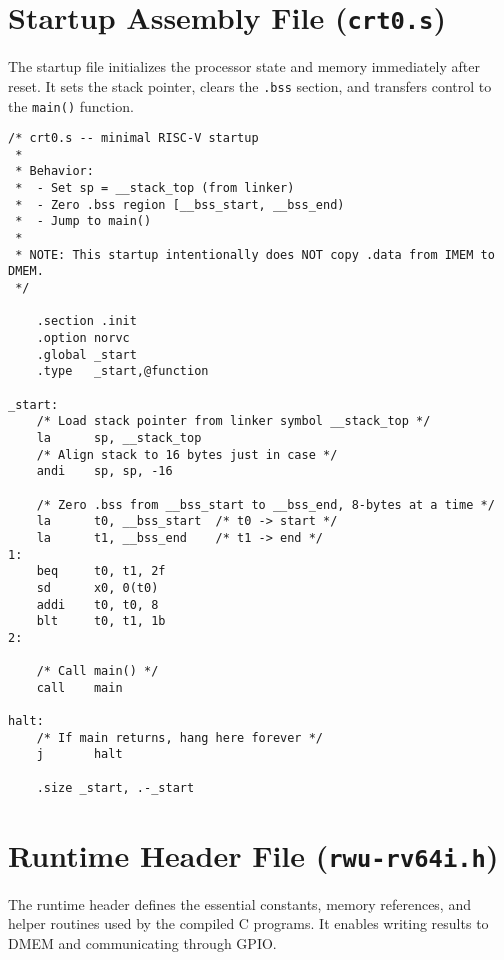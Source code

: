 \section{Startup Assembly File (\texttt{crt0.s})}
\label{app:startup_file}

The startup file initializes the processor state and memory immediately after reset.  
It sets the stack pointer, clears the \texttt{.bss} section, and transfers control to the \texttt{main()} function.

\begin{lstlisting}[language={[x86masm]Assembler},caption={RWU-RV64I Startup File},label={lst:startup_file}]
/* crt0.s -- minimal RISC-V startup
 *
 * Behavior:
 *  - Set sp = __stack_top (from linker)
 *  - Zero .bss region [__bss_start, __bss_end)
 *  - Jump to main()
 *
 * NOTE: This startup intentionally does NOT copy .data from IMEM to DMEM.
 */

    .section .init
    .option norvc
    .global _start
    .type   _start,@function

_start:
    /* Load stack pointer from linker symbol __stack_top */
    la      sp, __stack_top
    /* Align stack to 16 bytes just in case */
    andi    sp, sp, -16

    /* Zero .bss from __bss_start to __bss_end, 8-bytes at a time */
    la      t0, __bss_start  /* t0 -> start */
    la      t1, __bss_end    /* t1 -> end */
1:
    beq     t0, t1, 2f
    sd      x0, 0(t0)
    addi    t0, t0, 8
    blt     t0, t1, 1b
2:

    /* Call main() */
    call    main

halt:
    /* If main returns, hang here forever */
    j       halt

    .size _start, .-_start
\end{lstlisting}

\section{Runtime Header File (\texttt{rwu-rv64i.h})}
\label{app:runtime_header}

The runtime header defines the essential constants, memory references, and helper routines used by the compiled C programs.  
It enables writing results to DMEM and communicating through GPIO.

